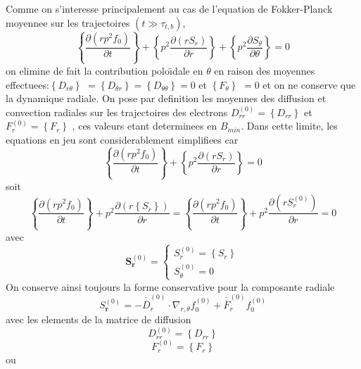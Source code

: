 Comme on s'interesse principalement au cas de l'equation de Fokker-Planck
moyennee sur les trajectoires $\left(t\gg\tau_{t,b}\right)$, \[
\left\{ \frac{\partial\left(rp^{2}f_{0}\right)}{\partial t}\right\} +\left\{ p^{2}\frac{\partial\left(rS_{r}\right)}{\partial r}\right\} +\left\{ p^{2}\frac{\partial S_{\theta}}{\partial\theta}\right\} =0\]
 on elimine de fait la contribution polo\"{\i}dale en $\theta$ en
raison des moyennes effectuees:$\left\{ D_{r\theta}\right\} $ $=\left\{ D_{\theta r}\right\} =\left\{ D_{\theta\theta}\right\} =0$
et $\left\{ F_{\theta}\right\} $ $=0$ et on ne conserve que la dynamique
radiale. On pose par definition les moyennes des diffusion et convection
radiales sur les trajectoires des electrons $D_{rr}^{\left(0\right)}=\left\{ D_{rr}\right\} $
et $F_{r}^{\left(0\right)}=\left\{ F_{r}\right\} $ , ces valeurs
etant determinees en $B_{min}$. Dans cette limite, les equations
en jeu sont considerablement simplifiees car \[
\left\{ \frac{\partial\left(rp^{2}f_{0}\right)}{\partial t}\right\} +\left\{ p^{2}\frac{\partial\left(rS_{r}\right)}{\partial r}\right\} =0\]
 soit \[
\left\{ \frac{\partial\left(rp^{2}f_{0}\right)}{\partial t}\right\} +p^{2}\frac{\partial\left(r\left\{ S_{r}\right\} \right)}{\partial r}=\left\{ \frac{\partial\left(rp^{2}f_{0}\right)}{\partial t}\right\} +p^{2}\frac{\partial\left(rS_{r}^{\left(0\right)}\right)}{\partial r}=0\]
 avec \[
\mathbf{S}_{\mathbf{r}}^{(0)}=\left\{ \begin{array}{l}
S_{r}^{\left(0\right)}=\left\{ S_{r}\right\} \\
S_{\theta}^{\left(0\right)}=0\end{array}\right.\]
 On conserve ainsi toujours la forme conservative pour la composante
radiale \[
S_{\mathbf{r}}^{(0)}=-\overline{\overline{D}}_{r}^{(0)}\cdot\nabla_{r,\theta}f_{0}^{(0)}+\overline{\overline{F}}_{r}^{(0)}f_{0}^{(0)}\]
 avec les elements de la matrice de diffusion \[
D_{rr}^{(0)}=\left\{ D_{rr}\right\} \]
 \[
F_{r}^{(0)}=\left\{ F_{r}\right\} \]
 ou

